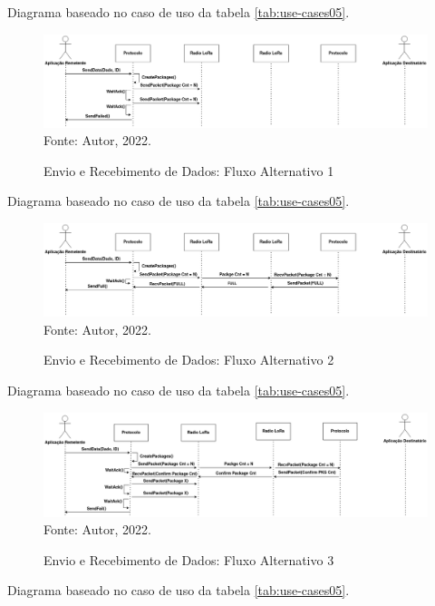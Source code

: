 Diagrama baseado no caso de uso da tabela \ref{tab:use-cases05}.

\begin{figure}[htp]
    \centering
	\caption{Envio e Recebimento de Dados: Fluxo Alternativo 1}
    \includegraphics[width=\textwidth,height=0.13\textheight]{img/data-fa.drawio.png}
    \label{fig:sq-data-fa}
    Fonte: Autor, 2022.
\end{figure}

Diagrama baseado no caso de uso da tabela \ref{tab:use-cases05}.
\newpage

\begin{figure}[htp]
    \centering
	\caption{Envio e Recebimento de Dados: Fluxo Alternativo 2}
    \includegraphics[width=\textwidth]{img/data-fa2.drawio.png}
    \label{fig:sq-data-fa2}
    Fonte: Autor, 2022.
\end{figure}

Diagrama baseado no caso de uso da tabela \ref{tab:use-cases05}.

\begin{figure}[htp]
    \centering
	\caption{Envio e Recebimento de Dados: Fluxo Alternativo 3}
    \includegraphics[width=\textwidth]{img/data-fa3.drawio.png}
    \label{fig:sq-data-fa3}
    Fonte: Autor, 2022.
\end{figure}

Diagrama baseado no caso de uso da tabela \ref{tab:use-cases05}.
\newpage

